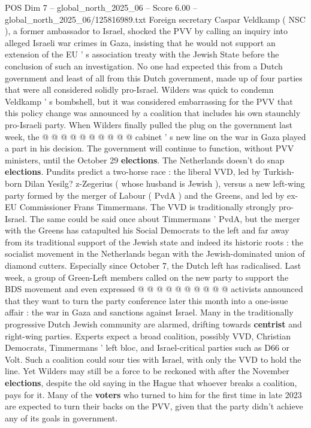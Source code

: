 \begin{textsample}{POS Dim 7 – global\_north\_2025\_06 – Score 6.00 – global\_north\_2025\_06/125816989.txt}
Foreign secretary Caspar Veldkamp ( NSC ), a former ambassador to Israel, shocked the PVV by calling an inquiry into alleged Israeli war crimes in Gaza, insisting that he would not support an extension of the EU ' s association treaty with the Jewish State before the conclusion of such an investigation.
No one had expected this from a Dutch government and least of all from this Dutch government, made up of four parties that were all considered solidly pro-Israel.
Wilders was quick to condemn Veldkamp ' s bombshell, but it was considered embarrassing for the PVV that this policy change was announced by a coalition that includes his own staunchly pro-Israeli party.
When Wilders finally pulled the plug on the government last week, the @ @ @ @ @ @ @ @ @ @ cabinet ' s new line on the war in Gaza played a part in his decision.
The government will continue to function, without PVV ministers, until the October 29 \textbf{elections}.
The Netherlands doesn't do snap \textbf{elections}.
Pundits predict a two-horse race : the liberal VVD, led by Turkish-born Dilan Yesilg? z-Zegerius ( whose husband is Jewish ), versus a new left-wing party formed by the merger of Labour ( PvdA ) and the Greens, and led by ex-EU Commissioner Frans Timmermans.
The VVD is traditionally strongly pro-Israel.
The same could be said once about Timmermans ' PvdA, but the merger with the Greens has catapulted his Social Democrats to the left and far away from its traditional support of the Jewish state and indeed its historic roots : the socialist movement in the Netherlands began with the Jewish-dominated union of diamond cutters.
Especially since October 7, the Dutch left has radicalised.
Last week, a group of Green-Left members called on the new party to support the BDS movement and even expressed @ @ @ @ @ @ @ @ @ @ activists announced that they want to turn the party conference later this month into a one-issue affair : the war in Gaza and sanctions against Israel.
Many in the traditionally progressive Dutch Jewish community are alarmed, drifting towards \textbf{centrist} and right-wing parties.
Experts expect a broad coalition, possibly VVD, Christian Democrats, Timmermans ' left bloc, and Israel-critical parties such as D66 or Volt.
Such a coalition could sour ties with Israel, with only the VVD to hold the line.
Yet Wilders may still be a force to be reckoned with after the November \textbf{elections}, despite the old saying in the Hague that whoever breaks a coalition, pays for it.
Many of the \textbf{voters} who turned to him for the first time in late 2023 are expected to turn their backs on the PVV, given that the party didn't achieve any of its goals in government.

\end{textsample}
